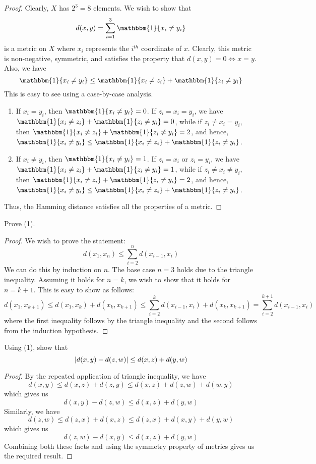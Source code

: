 {\begin{proof}
    Clearly, $X$ has $2^3 = 8$ elements. We wish to show that 
    \[d(x,y) = \sum_{i=1}^3 \mathbbm{1}\{x_i \neq y_i\}\]
    is a metric on $X$ where $x_i$ represents the $i^{th}$ coordinate of $x$. Clearly, this metric is non-negative, symmetric, and satisfies the property that $d(x,y) = 0 \iff x = y$. Also, we have
    \[\mathbbm{1}\{x_i \neq y_i\} \leq \mathbbm{1}\{x_i \neq z_i\} + \mathbbm{1}\{z_i \neq y_i\}\]
    This is easy to see using a case-by-case analysis. 
    \begin{enumerate}
        \item If $x_i = y_i$, then $\mathbbm{1}\{x_i \neq y_i\} = 0$. If $z_i = x_i = y_i$, we have $\mathbbm{1}\{x_i \neq z_i\} + \mathbbm{1}\{z_i \neq y_i\} = 0$, while if $z_i \neq x_i = y_i$, then $\mathbbm{1}\{x_i \neq z_i\} + \mathbbm{1}\{z_i \neq y_i\} = 2$, and hence, $\mathbbm{1}\{x_i \neq y_i\} \leq \mathbbm{1}\{x_i \neq z_i\} + \mathbbm{1}\{z_i \neq y_i\}$.
        \item If $x_i \neq y_i$, then $\mathbbm{1}\{x_i \neq y_i\} = 1$. If $z_i = x_i$ or $z_i = y_i$, we have $\mathbbm{1}\{x_i \neq z_i\} + \mathbbm{1}\{z_i \neq y_i\} = 1$, while if $z_i \neq x_i \neq y_i$, then $\mathbbm{1}\{x_i \neq z_i\} + \mathbbm{1}\{z_i \neq y_i\} = 2$, and hence, $\mathbbm{1}\{x_i \neq y_i\} \leq \mathbbm{1}\{x_i \neq z_i\} + \mathbbm{1}\{z_i \neq y_i\}$.
    \end{enumerate}
    Thus, the Hamming distance satisfies all the properties of a metric.
\end{proof}

\begin{question}
    Prove (1).
    \label{section1.1-11}
\end{question}
\begin{proof}
    We wish to prove the statement:
    \[d(x_1 , x_n) \leq  \sum_{i=2}^n d(x_{i-1} , x_i)\]
    We can do this by induction on $n$. The base case $n = 3$ holds due to the triangle inequality. Assuming it holds for $n = k$, we wish to show that it holds for $n = k+1$. This is easy to show as follows:
    \[d(x_1 , x_{k+1}) \leq d(x_1 , x_k) + d(x_k , x_{k+1}) \leq \sum_{i=2}^k d(x_{i-1} , x_{i}) + d(x_k , x_{k+1}) = \sum_{i=2}^{k+1} d(x_{i-1} , x_i)\]
    where the first inequality follows by the triangle inequality and the second follows from the induction hypothesis.
\end{proof}

\begin{question}
    Using (1), show that
    \[\left\lvert d(x,y) - d(z,w) \right\rvert \leq d(x,z) + d(y,w)\]
    \label{section1.1-12}
\end{question}
\begin{proof}
    By the repeated application of triangle inequality, we have
    \[d(x,y) \leq d(x,z) + d(z,y) \leq d(x,z) + d(z,w) + d(w,y)\]
    which gives us 
    \[d(x,y) - d(z,w) \leq d(x,z) + d(y,w)\]
    Similarly, we have
    \[d(z,w) \leq d(z,x) + d(x,z) \leq d(z,x) +  d(x,y) + d(y,w)\]
    which gives us
    \[d(z,w) - d(x,y) \leq d(x,z) + d(y,w)\]
    Combining both these facts and using the symmetry property of metrics gives us the required result.
\end{proof}

}
